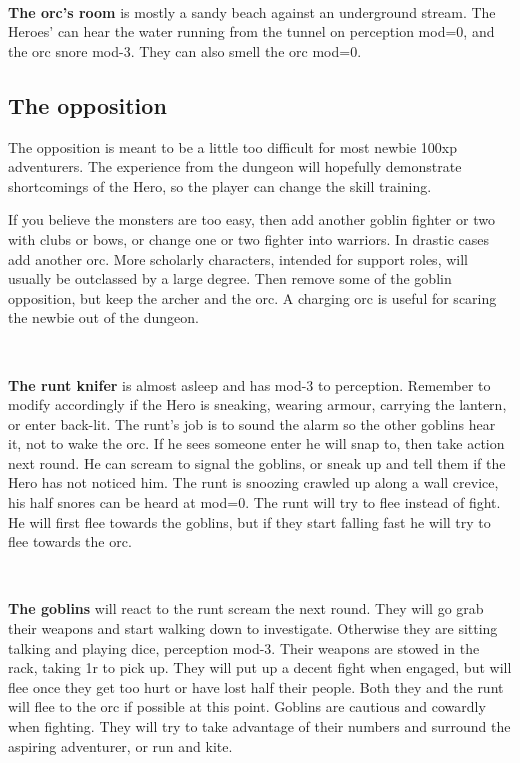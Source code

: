 \

\textbf{The orc's room} is mostly a sandy beach against an underground stream. The Heroes' can hear the water running from the tunnel on perception mod=0, and the orc snore mod-3. They can also smell the orc mod=0.



\subsection*{The opposition}

The opposition is meant to be a little too difficult for most newbie 100xp adventurers. The experience from the dungeon will hopefully demonstrate shortcomings of the Hero, so the player can change the skill training.

If you believe the monsters are too easy, then add another goblin fighter or two with clubs or bows, or change one or two fighter into warriors. In drastic cases add another orc.
More scholarly characters, intended for support roles, will usually be outclassed by a large degree. Then remove some of the goblin opposition, but keep the archer and the orc. A charging orc is useful for scaring the newbie out of the dungeon.

\

\textbf{The runt knifer} is almost asleep and has mod-3 to perception. Remember to modify accordingly if the Hero is sneaking, wearing armour, carrying the lantern, or enter back-lit. The runt's job is to sound the alarm so the other goblins hear it, not to wake the orc. If he sees someone enter he will snap to, then take action next round. He can scream to signal the goblins, or sneak up and tell them if the Hero has not noticed him. The runt is snoozing crawled up along a wall crevice, his half snores can be heard at mod=0.
The runt will try to flee instead of fight. He will first flee towards the goblins, but if they start falling fast he will try to flee towards the orc.

\

\textbf{The goblins} will react to the runt scream the next round. They will go grab their weapons and start walking down to investigate. Otherwise they are sitting talking and playing dice, perception mod-3. Their weapons are stowed in the rack, taking 1r to pick up.
They will put up a decent fight when engaged, but will flee once they get too hurt or have lost half their people. Both they and the runt will flee to the orc if possible at this point.
Goblins are cautious and cowardly when fighting. They will try to take advantage of their numbers and surround the aspiring adventurer, or run and kite.

